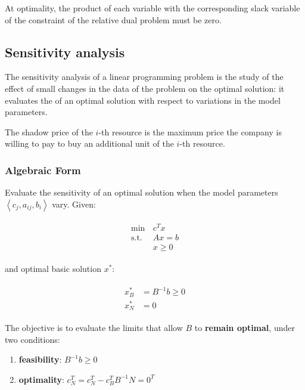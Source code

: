 \documentclass[english]{article}
\begin{document}
At optimality, the product of each variable with the corresponding slack variable of the constraint of the relative dual problem must be zero.

\subsection{Sensitivity analysis}
\label{sec:sensitivity-analysis}

The sensitivity analysis of a linear programming problem is the study of the effect of small changes in the data of the problem on the optimal solution:
it evaluates the  of an optimal solution with respect to variations in the model parameters.

\begin{definition}
  The shadow price of the \(i\)-th resource is the maximum price the company is willing to pay to buy an additional unit of the \(i\)-th resource.
\end{definition}

\subsubsection{Algebraic Form}

Evaluate the sensitivity of an optimal solution when the model parameters \(\left\langle c_j, a_{ij}, b_i \right\rangle\) vary.
Given:

\begin{gather*}
  \begin{aligned}
    \min \,        & c^T x    \\
    \text{s.t.} \, & Ax = b   \\
                   & x \geq 0
  \end{aligned}
\end{gather*}

and optimal basic solution \(x^\ast\):

\begin{gather*}
  \begin{aligned}
    x_B^\ast & = B^{-1} b \geq 0 \\
    x_N^\ast & = 0
  \end{aligned}
\end{gather*}

The objective is to evaluate the limits that allow \(B\) to \textbf{remain optimal}, under two conditions:

\begin{enumerate}[itemsep=0.5ex]
  \item \textbf{feasibility}: \(B^{-1} b \geq 0\)
  \item \textbf{optimality}: \(c_N^T = c_N^T - c_B^T B^{-1} N = 0^T\)
\end{enumerate}
\end{document}
